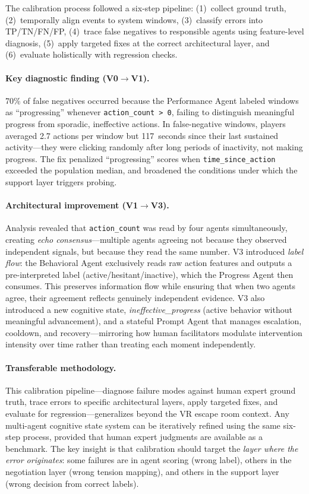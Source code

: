 The calibration process followed a six-step pipeline: (1)~collect ground truth, (2)~temporally align events to system windows, (3)~classify errors into TP/TN/FN/FP, (4)~trace false negatives to responsible agents using feature-level diagnosis, (5)~apply targeted fixes at the correct architectural layer, and (6)~evaluate holistically with regression checks.

\paragraph{Key diagnostic finding (V0$\rightarrow$V1).} 70\% of false negatives occurred because the Performance Agent labeled windows as ``progressing'' whenever \texttt{action\_count > 0}, failing to distinguish meaningful progress from sporadic, ineffective actions. In false-negative windows, players averaged 2.7 actions per window but 117~seconds since their last sustained activity---they were clicking randomly after long periods of inactivity, not making progress. The fix penalized ``progressing'' scores when \texttt{time\_since\_action} exceeded the population median, and broadened the conditions under which the support layer triggers probing.

\paragraph{Architectural improvement (V1$\rightarrow$V3).} Analysis revealed that \texttt{action\_count} was read by four agents simultaneously, creating \emph{echo consensus}---multiple agents agreeing not because they observed independent signals, but because they read the same number. V3 introduced \emph{label flow}: the Behavioral Agent exclusively reads raw action features and outputs a pre-interpreted label (active/hesitant/inactive), which the Progress Agent then consumes. This preserves information flow while ensuring that when two agents agree, their agreement reflects genuinely independent evidence. V3 also introduced a new cognitive state, \emph{ineffective\_progress} (active behavior without meaningful advancement), and a stateful Prompt Agent that manages escalation, cooldown, and recovery---mirroring how human facilitators modulate intervention intensity over time rather than treating each moment independently.

\paragraph{Transferable methodology.} This calibration pipeline---diagnose failure modes against human expert ground truth, trace errors to specific architectural layers, apply targeted fixes, and evaluate for regression---generalizes beyond the VR escape room context. Any multi-agent cognitive state system can be iteratively refined using the same six-step process, provided that human expert judgments are available as a benchmark. The key insight is that calibration should target the \emph{layer where the error originates}: some failures are in agent scoring (wrong label), others in the negotiation layer (wrong tension mapping), and others in the support layer (wrong decision from correct labels).
